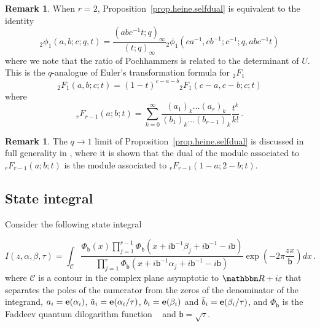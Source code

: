 \documentclass[12pt,reqno]{amsart}
\theoremstyle{definition}
\newtheorem{remark}[theorem]{Remark}
\def\BR{\mathbbm R}
\def\calC{\mathcal C}
\def\ve{\varepsilon}
\def\be{\begin{equation}}
\def\ee{\end{equation}}
\def\sfb{\mathsf{b}}
\def\e{\bold e}
\def\sfb{\mathsf{b}}
\begin{document}
\begin{remark}
  \label{rem.r=2}
When $r=2$, Proposition~\ref{prop.heine.selfdual} is equivalent to the identity
~\cite[Eqn.(1.4.3)]{Gasper}
\be
  {}_{2}\phi_{1}(a,b;c;q,t)
  =
  \frac{(abc^{-1}t;q)_{\infty}}{(t;q)_{\infty}}
  {}_{2}\phi_{1}(ca^{-1},cb^{-1};c^{-1};q,abc^{-1}t)
\ee
where we note that the ratio of Pochhammers is related to the determinant of $U$.
This is the $q$-analogue of Euler's transformation formula for ${}_2F_{1}$
~\cite[Eqn.(1.4.2)]{Gasper}
\be
  {}_{2}F_{1}(a,b;c;t)=(1-t)^{c-a-b}{}_{2}F_{1}(c-a,c-b;c;t)
\ee
where
\be
{}_{r}F_{r-1}(a;b;t) =
\sum_{k=0}^{\infty}
\frac{(a_{1})_{k}\dots(a_{r})_{k}}{(b_{1})_{k}\dots(b_{r-1})_{k}}\frac{t^{k}}{k!} \,.
\ee
\end{remark}

\begin{remark}
\label{rem.q=1}
The $q\rightarrow 1$ limit of Proposition~\ref{prop.heine.selfdual} is discussed
in full generality in \cite[Thm.1.1]{Beukers:duality}, where it is shown that the
dual of the module associated to ${}_{r}F_{r-1}(a;b;t)$ is the module associated to
${}_{r}F_{r-1}(1-a;2-b;t)$.
\end{remark}

\subsection{State integral}
\label{subsec.heine.stateint}

Consider the following state integral

\be
\label{heine.stateint}
I(z,\alpha,\beta,\tau) = 
\int_{\calC} \frac{\Phi_{\sfb}(x)
  \prod_{j=1}^{r-1} \Phi_{\sfb}(x+i\sfb^{-1}\beta_{j}+i\sfb^{-1}-i\sfb)}{
\prod_{j=1}^{r} \Phi_{\sfb}(x+i\sfb^{-1}\alpha_{j}+i\sfb^{-1}-i\sfb)}
\exp\left(-2\pi\frac{zx}{\sfb}\right)
dx \,.
\ee
where $\calC$ is a contour in the complex plane asymptotic to
$\BR+i\ve$ that separates the poles of the numerator from the zeros of the
denominator of the integrand, $a_{i}=\e(\alpha_{i})$,
$\tilde{a}_{i}=\e(\alpha_{i}/\tau)$, $b_{i}=\e(\beta_{i})$ and
$\tilde{b}_{i}=\e(\beta_{i}/\tau)$, and $\Phi_\sfb$ is the Faddeev quantum
dilogarithm function ~\cite{Faddeev, FK-QDL} and $\sfb=\sqrt{\tau}$.
\end{document}
